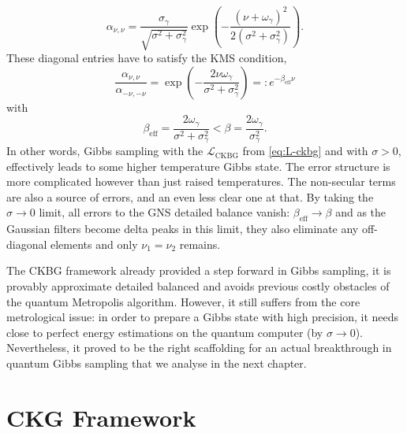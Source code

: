 \begin{equation}
    \alpha_{\nu, \nu} = \frac{\sigma_\gamma}{\sqrt{\sigma^2 + \sigma_\gamma^2}} \exp\left(-\frac{(\nu + \omega_\gamma)^2}{2(\sigma^2 + \sigma_\gamma^2)}\right).
\end{equation}
These diagonal entries have to satisfy the KMS condition,
\begin{equation} \label{eq:kossakowski-diag-condition}
    \frac{\alpha_{\nu, \nu}}{\alpha_{-\nu, -\nu}} = \exp\left(-\frac{2\nu\omega_\gamma}{\sigma^2 + \sigma_\gamma^2}\right) =: e^{-\beta_\text{eff} \nu}
\end{equation}
with 
\begin{equation} \label{eq:beta-eff}
    \beta_\text{eff} = \frac{2 \omega_\gamma}{\sigma^2 + \sigma_\gamma^2} < \beta = \frac{2\omega_\gamma}{\sigma_\gamma^2}.
\end{equation}
In other words, Gibbs sampling with the $\mathcal{L}_\text{CKBG}$ from \eqref{eq:L-ckbg} and with $\sigma > 0$, effectively leads to some higher temperature Gibbs state. The error structure is more complicated however than just raised temperatures. The non-secular terms are also a source of errors, and an even less clear one at that. By taking the $\sigma \rightarrow 0$ limit, all errors to the GNS detailed balance vanish: $\beta_\text{eff} \rightarrow \beta$ and as the Gaussian filters become delta peaks in this limit, they also eliminate any off-diagonal elements and only $\nu_1 = \nu_2$ remains.

The CKBG framework already provided a step forward in Gibbs sampling, it is provably approximate detailed balanced and avoids previous costly obstacles of the quantum Metropolis algorithm. However, it still suffers from the core metrological issue: in order to prepare a Gibbs state with high precision, it needs close to perfect energy estimations on the quantum computer (by $\sigma \to 0$). Nevertheless, it proved to be the right scaffolding for an actual breakthrough in quantum Gibbs sampling that we analyse in the next chapter.

\chapter{CKG Framework}
\smallskip
\label{sec:kms-lindbladian}
